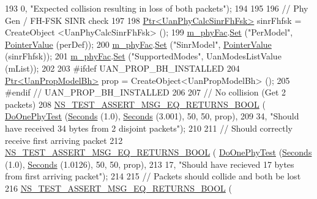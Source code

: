 \begin{DoxyCode}
193                                       0, \textcolor{stringliteral}{"Expected collision resulting in loss of both packets"});
194 
195 
196   \textcolor{comment}{// Phy Gen / FH-FSK SINR check}
197 
198   \hyperlink{classns3_1_1Ptr}{Ptr<UanPhyCalcSinrFhFsk>} sinrFhfsk = CreateObject <UanPhyCalcSinrFhFsk> ();
199   \hyperlink{classUanTest_aa3af462909130b54c4b43b5bca42446b}{m\_phyFac}.\hyperlink{classns3_1_1ObjectFactory_aef5c0d5019c96bdf01cefd1ff83f4a68}{Set} (\textcolor{stringliteral}{"PerModel"}, \hyperlink{classns3_1_1PointerValue}{PointerValue} (perDef));
200   \hyperlink{classUanTest_aa3af462909130b54c4b43b5bca42446b}{m\_phyFac}.\hyperlink{classns3_1_1ObjectFactory_aef5c0d5019c96bdf01cefd1ff83f4a68}{Set} (\textcolor{stringliteral}{"SinrModel"}, \hyperlink{classns3_1_1PointerValue}{PointerValue} (sinrFhfsk));
201   \hyperlink{classUanTest_aa3af462909130b54c4b43b5bca42446b}{m\_phyFac}.\hyperlink{classns3_1_1ObjectFactory_aef5c0d5019c96bdf01cefd1ff83f4a68}{Set} (\textcolor{stringliteral}{"SupportedModes"}, UanModesListValue (mList));
202 
203 \textcolor{preprocessor}{#ifdef UAN\_PROP\_BH\_INSTALLED}
204   \hyperlink{classns3_1_1Ptr}{Ptr<UanPropModelBh>} prop = CreateObject<UanPropModelBh> ();
205 \textcolor{preprocessor}{#endif // UAN\_PROP\_BH\_INSTALLED}
206 
207   \textcolor{comment}{//  No collision (Get 2 packets)}
208   \hyperlink{group__testing_ga5649dddde97a42ddfd4cd88aa53b37c6}{NS\_TEST\_ASSERT\_MSG\_EQ\_RETURNS\_BOOL} (
      \hyperlink{classUanTest_a006331b086a052683abed216dc67dd8d}{DoOnePhyTest} (\hyperlink{group__timecivil_ga33c34b816f8ff6628e33d5c8e9713b9e}{Seconds} (1.0), \hyperlink{group__timecivil_ga33c34b816f8ff6628e33d5c8e9713b9e}{Seconds} (3.001), 50, 50, prop),
209                                       34, \textcolor{stringliteral}{"Should have received 34 bytes from 2 disjoint packets"});
210 
211   \textcolor{comment}{// Should correctly receive first arriving packet}
212   \hyperlink{group__testing_ga5649dddde97a42ddfd4cd88aa53b37c6}{NS\_TEST\_ASSERT\_MSG\_EQ\_RETURNS\_BOOL} (
      \hyperlink{classUanTest_a006331b086a052683abed216dc67dd8d}{DoOnePhyTest} (\hyperlink{group__timecivil_ga33c34b816f8ff6628e33d5c8e9713b9e}{Seconds} (1.0), \hyperlink{group__timecivil_ga33c34b816f8ff6628e33d5c8e9713b9e}{Seconds} (1.0126), 50, 50, prop),
213                                       17, \textcolor{stringliteral}{"Should have recieved 17 bytes from first arriving packet"});
214 
215   \textcolor{comment}{// Packets should collide and both be lost}
216   \hyperlink{group__testing_ga5649dddde97a42ddfd4cd88aa53b37c6}{NS\_TEST\_ASSERT\_MSG\_EQ\_RETURNS\_BOOL} (

\end{DoxyCode}
